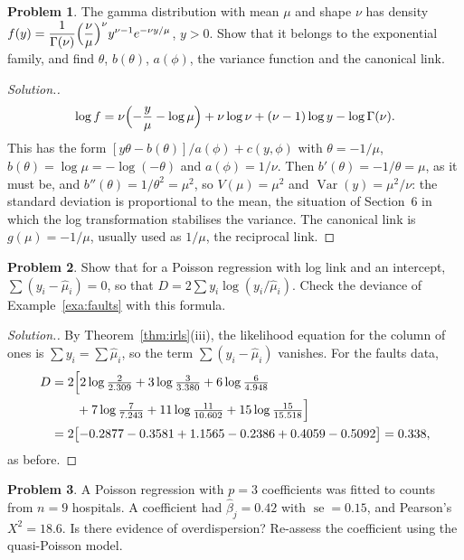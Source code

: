 \documentclass[11pt,a4paper]{article}
\numberwithin{equation}{section}
\theoremstyle{definition}
\newtheorem{problemx}{Problem}[subsection]
\newenvironment{problem}{\begin{problemx}}{\end{problemx}}
\newenvironment{solution}
  {\renewcommand{\qedsymbol}{}\begin{proof}[\textit{Solution}.]}
  {\end{proof}}
\begin{document}
\begin{problem}\label{prob:gamma}
The gamma distribution with mean $\mu$ and shape $\nu$ has density
$f(y) = \dfrac{1}{\Gamma(\nu)}\Bigl(\dfrac{\nu}{\mu}\Bigr)^\nu y^{\nu - 1}e^{-\nu y/\mu}$, $y > 0$. Show that it belongs to the exponential family, and find
$\theta$, $b(\theta)$, $a(\phi)$, the variance function and the canonical link.
\end{problem}

\begin{solution}
\[
\log f = \nu\Bigl(-\frac{y}{\mu} - \log\mu\Bigr) + \nu\log\nu + (\nu - 1)\log y - \log\Gamma(\nu) .
\]
This has the form $[y\theta - b(\theta)]/a(\phi) + c(y, \phi)$ with $\theta = -1/\mu$, $b(\theta) = \log\mu = -\log(-\theta)$ and $a(\phi) = 1/\nu$. Then
$b'(\theta) = -1/\theta = \mu$, as it must be, and $b''(\theta) = 1/\theta^2 = \mu^2$, so $V(\mu) = \mu^2$ and $\operatorname{Var}(y) = \mu^2/\nu$: the standard deviation
is proportional to the mean, the situation of Section~6 in which the log transformation stabilises the variance.
The canonical link is $g(\mu) = -1/\mu$, usually used as $1/\mu$, the reciprocal link.
\end{solution}

\begin{problem}\label{prob:poisson-dev}
Show that for a Poisson regression with log link and an intercept, $\sum(y_i - \hat\mu_i) = 0$, so that
$D = 2\sum y_i\log(y_i/\hat\mu_i)$. Check the deviance of Example~\ref{exa:faults} with this formula.
\end{problem}

\begin{solution}
By Theorem~\ref{thm:irls}(iii), the likelihood equation for the column of ones is $\sum y_i = \sum\hat\mu_i$, so the term
$\sum(y_i - \hat\mu_i)$ vanishes. For the faults data,
\begin{align*}
D &= 2\Bigl[2\log\tfrac{2}{2.309} + 3\log\tfrac{3}{3.380} + 6\log\tfrac{6}{4.948} \\
&\qquad + 7\log\tfrac{7}{7.243} + 11\log\tfrac{11}{10.602} + 15\log\tfrac{15}{15.518}\Bigr] \\
&= 2\bigl[-0.2877 - 0.3581 + 1.1565 - 0.2386 + 0.4059 - 0.5092\bigr] = 0.338 ,
\end{align*}
as before.
\end{solution}

\begin{problem}\label{prob:overdispersion}
A Poisson regression with $p = 3$ coefficients was fitted to counts from $n = 9$ hospitals. A coefficient had
$\hat\beta_j = 0.42$ with $\operatorname{se} = 0.15$, and Pearson's $X^2 = 18.6$. Is there evidence of overdispersion? Re-assess the
coefficient using the quasi-Poisson model.
\end{problem}
\end{document}
